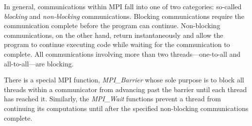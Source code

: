 In general, communications within MPI fall into one of two categories: so-called
\emph{blocking} and \emph{non-blocking} communications. Blocking communications
require the communication complete before the program can continue. Non-blocking
communications, on the other hand, return instantaneously and allow the program
to continue executing code while waiting for the communication to complete. All
communications involving more than two threads---\ie one-to-all and
all-to-all---are blocking.

There is a special MPI function, \emph{MPI\_Barrier} whose sole purpose is to
block all threads within a communicator from advancing past the barrier until
each thread has reached it. Similarly, the \emph{MPI\_Wait} functions prevent a
thread from continuing its computations until after the specified non-blocking
communications complete.
